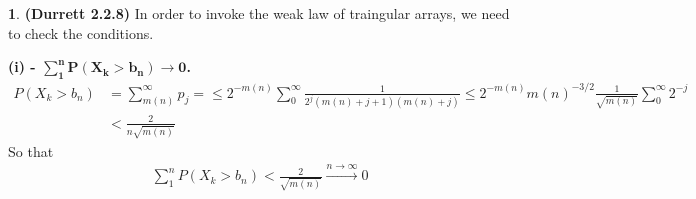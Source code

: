 \documentclass[10.5pt]{article}
\theoremstyle{definition}
\newtheorem{pb}{}
\begin{document}
    \begin{pb}\textbf{(Durrett 2.2.8)}
        In order to invoke the weak law of traingular arrays, we need to check the conditions.
        
        \textbf{(i) - \(\mathbf{\sum_1^n P(X_k>b_n) \to 0}\).}
        \begin{align*}
            P(X_k > b_n) &= \sum_{m(n)}^\infty p_j = \leq 2^{-m(n)}\sum_0^\infty \frac{1}{2^j(m(n)+j+1)(m(n)+j)} \leq 2^{-m(n)}m(n)^{-3/2}\frac{1}{\sqrt{m(n)}}\sum_0^\infty 2^{-j} \\&< \frac{2}{n\sqrt{m(n)}}
        \end{align*}
        So that
        \begin{align*}
            \sum_1^n P(X_k > b_n) < \frac{2}{\sqrt{m(n)}} \overset{n\to\infty}{\longrightarrow} 0
        \end{align*}


\end{pb}
\end{document}
